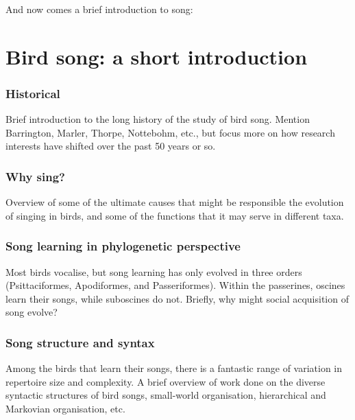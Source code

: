 \documentclass[]{report}
\begin{document}
And now comes a brief introduction to song:

\hypertarget{bird-song-a-short-introduction}{%
\section{Bird song: a short
introduction}\label{bird-song-a-short-introduction}}

\hypertarget{historical}{%
\subsubsection{Historical}\label{historical}}

Brief introduction to the long history of the study of bird song.
Mention Barrington, Marler, Thorpe, Nottebohm, etc., but focus more on
how research interests have shifted over the past 50 years or so.

\hypertarget{why-sing}{%
\subsubsection{Why sing?}\label{why-sing}}

Overview of some of the ultimate causes that might be responsible the
evolution of singing in birds, and some of the functions that it may
serve in different taxa.

\hypertarget{song-learning-in-phylogenetic-perspective}{%
\subsubsection{Song learning in phylogenetic
perspective}\label{song-learning-in-phylogenetic-perspective}}

Most birds vocalise, but song learning has only evolved in three orders
(Psittaciformes, Apodiformes, and Passeriformes). Within the passerines,
oscines learn their songs, while suboscines do not. Briefly, why might
social acquisition of song evolve?

\hypertarget{song-structure-and-syntax}{%
\subsubsection{Song structure and
syntax}\label{song-structure-and-syntax}}

Among the birds that learn their songs, there is a fantastic range of
variation in repertoire size and complexity. A brief overview of work
done on the diverse syntactic structures of bird songs, small-world
organisation, hierarchical and Markovian organisation, etc.
\end{document}
